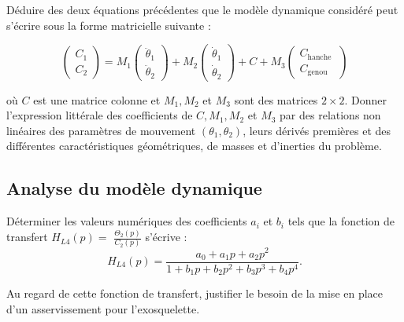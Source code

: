 \documentclass[11pt]{article}
\begin{document}
\UPSTIquestion  Déduire des deux équations précédentes que le modèle dynamique considéré peut s'écrire sous la forme matricielle suivante :

$$
\left(\begin{array}{l}
C_{1} \\
C_{2}
\end{array}\right)=M_{1}\left(\begin{array}{c}
\ddot{\theta}_{1} \\
\ddot{\theta}_{2}
\end{array}\right)+M_{2}\left(\begin{array}{c}
\dot{\theta}_{1} \\
\dot{\theta}_{2}
\end{array}\right)+C+M_{3}\left(\begin{array}{c}
C_{\textrm {hanche }} \\
C_{\textrm {genou }}
\end{array}\right)
$$
\begin{UPSTIcorrige}

\end{UPSTIcorrige}


où $C$ est une matrice colonne et $M_{1}, M_{2}$ et $M_{3}$ sont des matrices $2 \times 2$. Donner l'expression littérale des coefficients de $C, M_{1}, M_{2}$ et $M_{3}$ par des relations non linéaires des paramètres de mouvement $\left(\theta_{1}, \theta_{2}\right)$, leurs dérivés premières et des différentes caractéristiques géométriques, de masses et d'inerties du problème.
\begin{UPSTIcorrige}

\end{UPSTIcorrige}


\subsection{Analyse du modèle dynamique}

\UPSTIquestion Déterminer les valeurs numériques des coefficients $a_{i}$ et $b_{i}$ tels que la fonction de transfert $H_{L 4}(p)=$ $\frac{\Theta_{2}(p)}{C_{2}(p)}$ s'écrive :
$$
H_{L 4}(p)=\frac{a_{0}+a_{1} p+a_{2} p^{2}}{1+b_{1} p+b_{2} p^{2}+b_{3} p^{3}+b_{4} p^{4}}.
$$
\begin{UPSTIcorrige}

\end{UPSTIcorrige}


\UPSTIquestion Au regard de cette fonction de transfert, justifier le besoin de la mise en place d'un asservissement pour l'exosquelette.
\begin{UPSTIcorrige}

\end{UPSTIcorrige}
\end{document}
